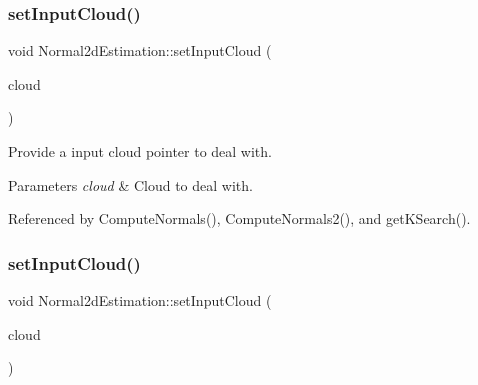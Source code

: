 \mbox{\label{classNormal2dEstimation_a8cd86c1bddf1eb5bc7cb11f0a12810f8}} 
\subsubsection{\texorpdfstring{set\+Input\+Cloud()}{setInputCloud()}\hspace{0.1cm}{\footnotesize\ttfamily [1/2]}}
{\footnotesize\ttfamily void Normal2d\+Estimation\+::set\+Input\+Cloud (\begin{DoxyParamCaption}\item[{const \hyperlink{Normal2dEstimation_8h_a389a43addc496dc19a5bb0575cc60bc4}{Const\+Ptr\+Cloud} \&}]{cloud }\end{DoxyParamCaption})}



Provide a input cloud pointer to deal with. 


\begin{DoxyParams}{Parameters}
{\em cloud} & Cloud to deal with. \\
\hline
\end{DoxyParams}


Referenced by Compute\+Normals(), Compute\+Normals2(), and get\+K\+Search().

\mbox{\label{classNormal2dEstimation_a8cd86c1bddf1eb5bc7cb11f0a12810f8}} 
\subsubsection{\texorpdfstring{set\+Input\+Cloud()}{setInputCloud()}\hspace{0.1cm}{\footnotesize\ttfamily [2/2]}}
{\footnotesize\ttfamily void Normal2d\+Estimation\+::set\+Input\+Cloud (\begin{DoxyParamCaption}\item[{const \hyperlink{Normal2dEstimation_8h_a389a43addc496dc19a5bb0575cc60bc4}{Const\+Ptr\+Cloud} \&}]{cloud }\end{DoxyParamCaption})\hspace{0.3cm}{\ttfamily [inline]}}

